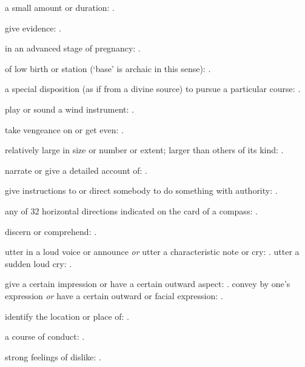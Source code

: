   a small amount or duration: .

  give evidence:   .

  in an advanced stage of pregnancy:   .

  of low birth or station (`base' is archaic in this sense):   .

  a special disposition (as if from a divine source) to pursue a particular course: .

  play or sound a wind instrument: .

  take vengeance on or get even:   .

  relatively large in size or number or extent; larger than others of its kind: .

  narrate or give a detailed account of:   .

  give instructions to or direct somebody to do something with authority:   .

  any of 32 horizontal directions indicated on the card of a compass:   .

  discern or comprehend: .

  utter in a loud voice or announce \textit{or} utter a characteristic note or cry: . utter a sudden loud cry:   .

  give a certain impression or have a certain outward aspect:   . convey by one's expression \textit{or} have a certain outward or facial expression: .

  identify the location or place of:   .

  a course of conduct:   .

  strong feelings of dislike: .

